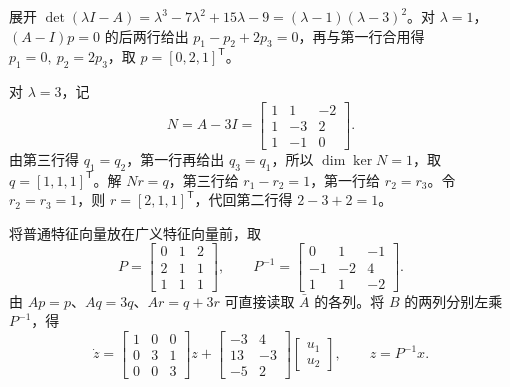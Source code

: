 

\sol 展开 $\det(\lambda I-A)=\lambda^3-7\lambda^2+15\lambda-9=(\lambda-1)(\lambda-3)^2$。对 $\lambda=1$，$(A-I)p=0$ 的后两行给出 $p_1-p_2+2p_3=0$，再与第一行合用得 $p_1=0,\ p_2=2p_3$，取 $p=[0,2,1]^{\mathsf T}$。

对 $\lambda=3$，记
\[
N=A-3I=\begin{bmatrix}1&1&-2\\1&-3&2\\1&-1&0\end{bmatrix}.
\]
由第三行得 $q_1=q_2$，第一行再给出 $q_3=q_1$，所以 $\dim\ker N=1$，取 $q=[1,1,1]^{\mathsf T}$。解 $Nr=q$，第三行给 $r_1-r_2=1$，第一行给 $r_2=r_3$。令 $r_2=r_3=1$，则 $r=[2,1,1]^{\mathsf T}$，代回第二行得 $2-3+2=1$。

将普通特征向量放在广义特征向量前，取
\[
P=\begin{bmatrix}0&1&2\\2&1&1\\1&1&1\end{bmatrix},\qquad
P^{-1}=\begin{bmatrix}0&1&-1\\-1&-2&4\\1&1&-2\end{bmatrix}.
\]
由 $Ap=p$、$Aq=3q$、$Ar=q+3r$ 可直接读取 $\bar A$ 的各列。将 $B$ 的两列分别左乘 $P^{-1}$，得
\[
\dot z=\begin{bmatrix}1&0&0\\0&3&1\\0&0&3\end{bmatrix}z+
\begin{bmatrix}-3&4\\13&-3\\-5&2\end{bmatrix}
\begin{bmatrix}u_1\\u_2\end{bmatrix},\qquad z=P^{-1}x.
\]

